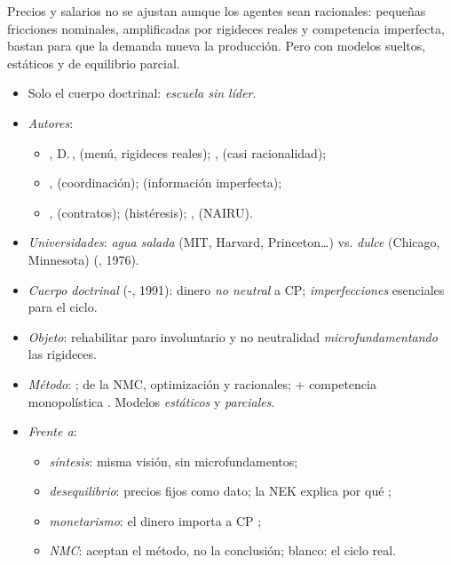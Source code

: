 \documentclass{article}
\begin{document}
\begin{columnas}
\begin{ideaclave}
Precios y salarios no se ajustan aunque los agentes sean racionales: pequeñas fricciones nominales, amplificadas por rigideces reales y competencia imperfecta, bastan para que la demanda mueva la producción. Pero con modelos sueltos, estáticos y de equilibrio parcial.
\end{ideaclave}

\begin{itemize}
\item Solo el cuerpo doctrinal: \emph{escuela sin líder}.
\item \emph{Autores}:
  \begin{itemize}
  \item {}, D.\,,  (menú, rigideces reales); ,  (casi racionalidad);
  \item {},  (coordinación);  (información imperfecta);
  \item {},  (contratos);  (histéresis); ,  (NAIRU).
  \end{itemize}
\item \emph{Universidades}: \emph{agua salada} (MIT, Harvard, Princeton\ldots) vs. \emph{dulce} (Chicago, Minnesota) (, 1976).
\item \emph{Cuerpo doctrinal} (-, 1991): dinero \emph{no neutral} a CP; \emph{imperfecciones} esenciales para el ciclo.
\item \emph{Objeto}: rehabilitar paro involuntario y no neutralidad \emph{microfundamentando} las rigideces.
\item \emph{Método}: ; de la NMC, optimización y racionales; + competencia monopolística . Modelos \emph{estáticos} y \emph{parciales}.
\item \emph{Frente a}:
  \begin{itemize}
  \item \emph{síntesis}: misma visión, sin microfundamentos;
  \item \emph{desequilibrio}: precios fijos como dato; la NEK explica por qué ;
  \item \emph{monetarismo}: el dinero importa a CP ;
  \item \emph{NMC}: aceptan el método, no la conclusión; blanco: el ciclo real.
  \end{itemize}
\end{itemize}


\end{columnas}
\end{document}
